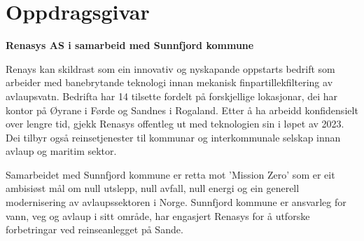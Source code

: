 \section{Oppdragsgivar}
\textbf{Renasys AS i samarbeid med Sunnfjord kommune}

Renays\citep{Renasys} kan skildrast som ein innovativ og nyskapande oppstarts bedrift som arbeider med banebrytande teknologi innan mekanisk finpartillekfiltering av avlaupsvatn.
Bedrifta har 14 tilsette fordelt på forskjellige lokasjonar, dei har kontor på Øyrane i Førde og Sandnes i Rogaland. 
Etter å ha arbeidd konfidensielt over lengre tid, gjekk Renasys offentleg ut med teknologien sin i løpet av 2023. 
Dei tilbyr også reinsetjenester til kommunar og interkommunale selskap innan avlaup og maritim sektor.

Samarbeidet med Sunnfjord kommune\citep{SunnfjordKommune} er retta mot 'Mission Zero' som er eit ambisiøst mål om 
null utslepp, null avfall, null energi og ein generell modernisering av avlaupssektoren i Norge.
Sunnfjord kommune er ansvarleg for vann, veg og avlaup i sitt område, har engasjert 
Renasys for å utforske forbetringar ved reinseanlegget på Sande.
\newline
\newline


